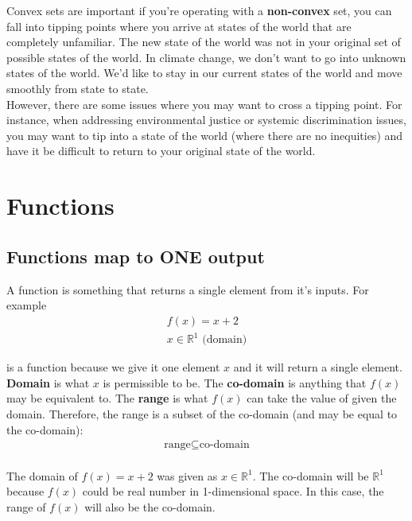 \documentclass{article}
\begin{document}
Convex sets are important if you're operating with a \textbf{non-convex} set, you can fall into tipping points where you arrive at states of the world that are completely unfamiliar. The new state of the world was not in your original set of possible states of the world. In climate change, we don't want to go into unknown states of the world. We'd like to stay in our current states of the world and move smoothly from state to state. \\

However, there are some issues where you may want to cross a tipping point. For instance, when addressing environmental justice or systemic discrimination issues, you may want to tip into a state of the world (where there are no inequities) and have it be difficult to return to your original state of the world. 

\section{Functions}

\subsection{Functions map to ONE output}

A function is something that returns a single element from it's inputs. For example 
\begin{align*}
    f(x) = x+2 \\
x \in \mathbb{R}^1  \text{ (domain)}
\end{align*}

is a function because we give it one element $x$ and it will return a single element. \\

\textbf{Domain} is what $x$ is permissible to be. The \textbf{co-domain} is anything that $f(x)$ may be equivalent to. The \textbf{range} is what $f(x)$ can take the value of given the domain. Therefore, the range is a subset of the co-domain (and may be equal to the co-domain): 
\begin{align*}
    \text{range} \subseteq \text{co-domain}
\end{align*}
\\

The domain of $f(x) = x+2$ was given as $x \in \mathbb{R}^1$. The co-domain will be $\mathbb{R}^1$ because $f(x)$ could be real number in 1-dimensional space. In this case, the range of $f(x)$ will also be the co-domain.\\
\end{document}
